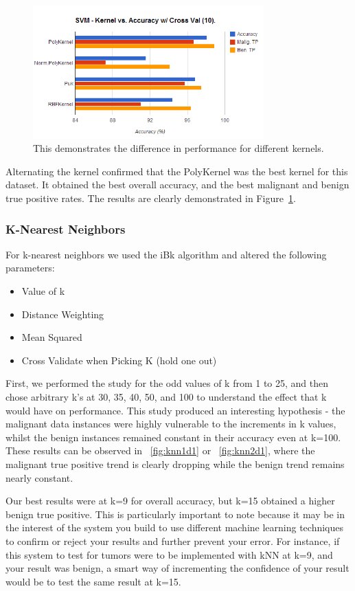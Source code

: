 \documentclass[annual]{acmsiggraph}
\begin{document}
\begin{figure}[ht]
  \centering
  \includegraphics[width=3.5in]{charts/chart_2_svm_d1.png}
  \caption{This demonstrates the difference in performance for different kernels.}
  \label{fig:svm2d1}
\end{figure}

Alternating the kernel confirmed that the PolyKernel was the best kernel for this dataset. It obtained the best overall accuracy, and the
best malignant and benign true positive rates. The results are clearly demonstrated in Figure~\ref{fig:svm2d1}.

\subsubsection{K-Nearest Neighbors}

For k-nearest neighbors we used the iBk algorithm and altered the following parameters:
\begin{itemize}
\item Value of k
\item Distance Weighting
\item Mean Squared
\item Cross Validate when Picking K (hold one out)
\end{itemize}

First, we performed the study for the odd values of k from 1 to 25, and then chose arbitrary k's at 30, 35, 40, 50, and 100 to understand
the effect that k would have on performance. This study produced an interesting hypothesis - the malignant data instances were highly 
vulnerable to the increments in k values, whilst the benign instances remained constant in their accuracy even at k=100. These results
can be observed in ~\ref{fig:knn1d1} or ~\ref{fig:knn2d1}, where the malignant true positive trend is clearly dropping while the
benign trend remains nearly constant.

Our best results were at k=9 for overall accuracy, but k=15 obtained a higher benign true positive. This is particularly important
to note because it may be in the interest of the system you build to use different machine learning techniques to confirm or reject
your results and further prevent your error. For instance, if this system to test for tumors were to be implemented with kNN at
k=9, and your result was benign, a smart way of incrementing the confidence of your result would be to test the same result at k=15.
\end{document}
